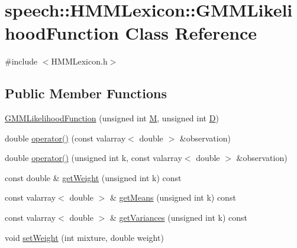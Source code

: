 \hypertarget{classspeech_1_1HMMLexicon_1_1GMMLikelihoodFunction}{\section{speech\+:\+:H\+M\+M\+Lexicon\+:\+:G\+M\+M\+Likelihood\+Function Class Reference}
\label{classspeech_1_1HMMLexicon_1_1GMMLikelihoodFunction}
}


{\ttfamily \#include $<$H\+M\+M\+Lexicon.\+h$>$}

\subsection*{Public Member Functions}
\begin{DoxyCompactItemize}
\item 
\hyperlink{classspeech_1_1HMMLexicon_1_1GMMLikelihoodFunction_a0398223855932fab00cce6ed3c7c9044}{G\+M\+M\+Likelihood\+Function} (unsigned int \hyperlink{classspeech_1_1HMMLexicon_1_1GMMLikelihoodFunction_aa163286d0699faf1dd14b01b6e118c13}{M}, unsigned int \hyperlink{classspeech_1_1HMMLexicon_1_1GMMLikelihoodFunction_a94b3da253b242046d0999c6138306fb3}{D})
\item 
double \hyperlink{classspeech_1_1HMMLexicon_1_1GMMLikelihoodFunction_a5f0bbd3150c1540c0fa12642890db2be}{operator()} (const valarray$<$ double $>$ \&observation)
\item 
double \hyperlink{classspeech_1_1HMMLexicon_1_1GMMLikelihoodFunction_aff059a88e4cd71d3c1e4aa2cba6d292d}{operator()} (unsigned int k, const valarray$<$ double $>$ \&observation)
\item 
const double \& \hyperlink{classspeech_1_1HMMLexicon_1_1GMMLikelihoodFunction_a7333805192ae53f09bb38978f9670a21}{get\+Weight} (unsigned int k) const 
\item 
const valarray$<$ double $>$ \& \hyperlink{classspeech_1_1HMMLexicon_1_1GMMLikelihoodFunction_a1d311f247c4b83d5f04ca7a4ed9a8ff0}{get\+Means} (unsigned int k) const 
\item 
const valarray$<$ double $>$ \& \hyperlink{classspeech_1_1HMMLexicon_1_1GMMLikelihoodFunction_a9ad16b9c22994013463956d647bd7d98}{get\+Variances} (unsigned int k) const 
\item 
void \hyperlink{classspeech_1_1HMMLexicon_1_1GMMLikelihoodFunction_ac5ee1801bfb91e86a2fa1526bb4d6c31}{set\+Weight} (int mixture, double weight)
\item 

\end{DoxyCompactItemize}
